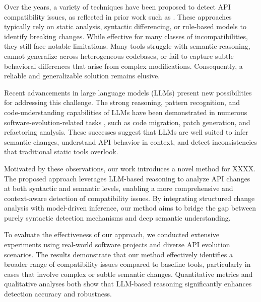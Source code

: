 Over the years, a variety of techniques have been proposed to detect API compatibility issues, as reflected in prior work such as \cite{A, B, C-shenkang}. These approaches typically rely on static analysis, syntactic differencing, or rule-based models to identify breaking changes. While effective for many classes of incompatibilities, they still face notable limitations. Many tools struggle with semantic reasoning, cannot generalize across heterogeneous codebases, or fail to capture subtle behavioral differences that arise from complex modifications. Consequently, a reliable and generalizable solution remains elusive.


Recent advancements in large language models (LLMs) present new possibilities for addressing this challenge. The strong reasoning, pattern recognition, and code-understanding capabilities of LLMs have been demonstrated in numerous software-evolution-related tasks \cite{XX, XX, XX}, such as code migration, patch generation, and refactoring analysis. These successes suggest that LLMs are well suited to infer semantic changes, understand API behavior in context, and detect inconsistencies that traditional static tools overlook.


Motivated by these observations, our work introduces a novel method for XXXX. The proposed approach leverages LLM-based reasoning to analyze API changes at both syntactic and semantic levels, enabling a more comprehensive and context-aware detection of compatibility issues. By integrating structured change analysis with model-driven inference, our method aims to bridge the gap between purely syntactic detection mechanisms and deep semantic understanding.


To evaluate the effectiveness of our approach, we conducted extensive experiments using real-world software projects and diverse API evolution scenarios. The results demonstrate that our method effectively identifies a broader range of compatibility issues compared to baseline tools, particularly in cases that involve complex or subtle semantic changes. Quantitative metrics and qualitative analyses both show that LLM-based reasoning significantly enhances detection accuracy and robustness.





